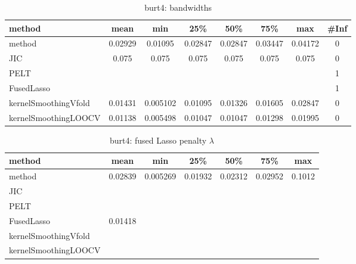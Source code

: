 \begin{table}[ht]
\centering
\begin{tabular}{l|c|ccccc|c}
  \hline
method & mean & min & 25\% & 50\% & 75\% & max & \#Inf \\ 
  \hline
method & 0.02929 & 0.01095 & 0.02847 & 0.02847 & 0.03447 & 0.04172 &   0 \\ 
  JIC & 0.075 & 0.075 & 0.075 & 0.075 & 0.075 & 0.075 &   0 \\ 
  PELT &  &  &  &  &  &  &   1 \\ 
  FusedLasso &  &  &  &  &  &  &   1 \\ 
  kernelSmoothingVfold & 0.01431 & 0.005102 & 0.01095 & 0.01326 & 0.01605 & 0.02847 &   0 \\ 
  kernelSmoothingLOOCV & 0.01138 & 0.005498 & 0.01047 & 0.01047 & 0.01298 & 0.01995 &   0 \\ 
   \hline
\end{tabular}
\caption{burt4: bandwidths} 
\label{tab:burt4Bandwidths}
\end{table}
\begin{table}[ht]
\centering
\begin{tabular}{l|c|ccccc}
  \hline
method & mean & min & 25\% & 50\% & 75\% & max \\ 
  \hline
method & 0.02839 & 0.005269 & 0.01932 & 0.02312 & 0.02952 & 0.1012 \\ 
  JIC &  &  &  &  &  &  \\ 
  PELT &  &  &  &  &  &  \\ 
  FusedLasso & 0.01418 &  &  &  &  &  \\ 
  kernelSmoothingVfold &  &  &  &  &  &  \\ 
  kernelSmoothingLOOCV &  &  &  &  &  &  \\ 
   \hline
\end{tabular}
\caption{burt4: fused Lasso penalty $\lambda$} 
\label{tab:burt4Lambdas}
\end{table}
